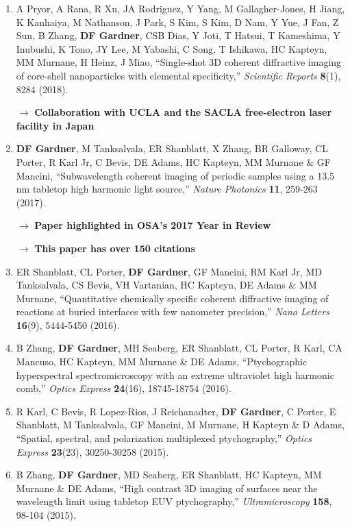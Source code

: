 \documentclass[letterpaper,12pt]{article}
\begin{document}
\begin{enumerate}[leftmargin=*]
	\item A Pryor, A Rana, R Xu, JA Rodriguez, Y Yang, M Gallagher-Jones, H Jiang, K Kanhaiya, M Nathanson, J Park, S Kim, S Kim, D Nam, Y Yue, J Fan, Z Sun, B Zhang, \textbf{DF Gardner}, CSB Dias, Y Joti, T Hatsui, T Kameshima, Y Inubushi, K Tono, JY Lee, M Yabashi, C Song, T Ishikawa, HC Kapteyn, MM Murnane, H Heinz, J Miao, ``Single-shot 3D coherent diffractive imaging of core-shell nanoparticles with elemental specificity,'' \emph{Scientific Reports} \textbf{8}(1), 8284 (2018).
	
	\quad $\rightarrow$ \textbf{Collaboration with UCLA and the SACLA free-electron laser facility in Japan}
	
	\item \textbf{DF Gardner}, M Tanksalvala, ER Shanblatt, X Zhang, BR Galloway, CL Porter, R Karl Jr, C Bevis, DE Adams, HC Kapteyn, MM Murnane \& GF Mancini, ``Subwavelength coherent imaging of periodic samples using a 13.5 nm tabletop high harmonic light source,'' \emph{Nature Photonics} \textbf{11}, 259-263 (2017).
	
	\quad $\rightarrow$ \textbf{Paper highlighted in OSA's 2017 Year in Review}
	
	\quad $\rightarrow$ \textbf{This paper has over 150 citations}
	
	\item ER Shanblatt, CL Porter, \textbf{DF Gardner}, GF Mancini, RM Karl Jr, MD Tanksalvala, CS Bevis, VH Vartanian, HC Kapteyn, DE Adams \& MM Murnane, ``Quantitative chemically specific coherent diffractive imaging of reactions at buried interfaces with few nanometer precision,'' \emph{Nano Letters} \textbf{16}(9), 5444-5450 (2016).
	
	\item B Zhang, \textbf{DF Gardner}, MH Seaberg, ER Shanblatt, CL Porter, R Karl, CA Mancuso, HC Kapteyn, MM Murnane \& DE Adams, ``Ptychographic hyperspectral spectromicroscopy with an extreme ultraviolet high harmonic comb,''  \emph{Optics Express} \textbf{24}(16), 18745-18754 (2016).
	
	\item R Karl, C Bevis, R Lopez-Rios, J Reichanadter, \textbf{DF Gardner}, C Porter, E Shanblatt, M Tanksalvala, GF Mancini, M Murnane, H Kapteyn \& D Adams, ``Spatial, spectral, and polarization multiplexed ptychography,'' \emph{Optics Express} \textbf{23}(23), 30250-30258 (2015).
	
	\item B Zhang, \textbf{DF Gardner}, MD Seaberg, ER Shanblatt, HC Kapteyn, MM Murnane \& DE Adams, ``High contrast 3D imaging of surfaces near the wavelength limit using tabletop EUV ptychography,'' \emph{Ultramicroscopy} \textbf{158}, 98-104 (2015).
	

\end{enumerate}
\end{document}
